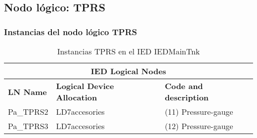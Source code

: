 
\subsection{Nodo l\'ogico: 			 TPRS}

    \subsubsection{Instancias del nodo l\'ogico TPRS}
    \begin{table}[H]
    \begin{center}
    \begin{tabular}{|l|l|p{6.8cm}|}
            \hline
            \multicolumn{3}{|c|}{\cellcolor[gray]{0.8} \textbf{IED Logical Nodes} } \\
            \hline
            \textbf{LN Name} & \textbf{Logical Device Allocation} & \textbf{Code and description} \\
            \hline
            Pa\_TPRS2 & LD7accesories & (11) Pressure-gauge \\
            \hline
            Pa\_TPRS3 & LD7accesories & (12) Pressure-gauge \\
            \hline
    \end{tabular}
    \caption{Instancias TPRS en el IED IEDMainTnk}
    \label{table:lnInstTPRS_gauge}
    \end{center}
    \end{table}
    
    
    
